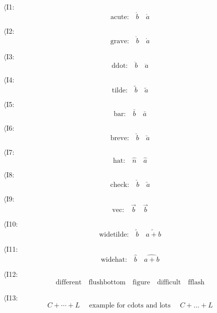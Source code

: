 \documentclass{book}
\begin{document}
$\langle$I1:
$$\mbox{acute:}\quad \acute{b}\quad \acute{a}$$

$\langle$I2:
$$\mbox{grave:}\quad \grave{b}\quad \grave{a}$$

$\langle$I3:
$$\mbox{ddot:}\quad \ddot{b}\quad \ddot{a}$$

$\langle$I4:
$$\mbox{tilde:}\quad \tilde{b}\quad \tilde{a}$$

$\langle$I5:
$$\mbox{bar:}\quad\bar{b}\quad \bar{a}$$

$\langle$I6:
$$\mbox{breve:}\quad\breve{b}\quad \breve{a}$$

$\langle$I7:
$$\mbox{hat:}\quad\hat{n}\quad \hat{a}$$

$\langle$I8:
$$\mbox{check:}\quad\check{b}\quad \check{a}$$

$\langle$I9:
$$\mbox{vec:}\quad\vec{b}\quad \vec{b}$$

$\langle$I10:
$$\mbox{widetilde:}\quad\widetilde{b}\quad \widetilde{a+b}$$

$\langle$I11:
$$\mbox{widehat:}\quad\widehat{b}\quad \widehat{a+b}$$

$\langle$I12:
$$\mbox{different}\quad \mbox{flushbottom}\quad \mbox{figure}\quad\mbox{difficult}\quad \mbox{fflash}$$

$\langle$I13:
$$C + \cdots + L \quad \mbox{ example for cdots and lots } \quad C +
	\ldots + L$$
\end{document}

